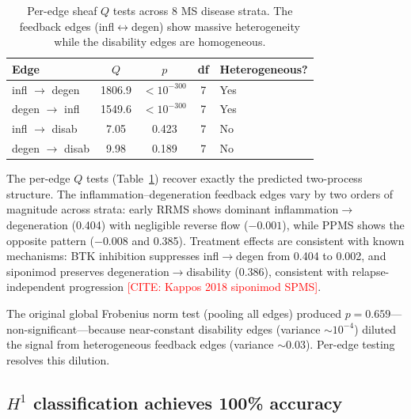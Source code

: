 \documentclass[11pt]{article}
\newcommand{\misscite}[1]{\textcolor{red}{[CITE: #1]}}
\begin{document}
\begin{table}[htbp]
\centering
\caption{Per-edge sheaf $Q$ tests across 8 MS disease strata. The
feedback edges (infl$\leftrightarrow$degen) show massive heterogeneity
while the disability edges are homogeneous.}
\label{tab:p2}
\begin{tabular}{@{}lcccl@{}}
\toprule
Edge & $Q$ & $p$ & df & Heterogeneous? \\
\midrule
infl $\to$ degen & 1806.9 & $< 10^{-300}$ & 7 & Yes \\
degen $\to$ infl & 1549.6 & $< 10^{-300}$ & 7 & Yes \\
infl $\to$ disab & 7.05 & 0.423 & 7 & No \\
degen $\to$ disab & 9.98 & 0.189 & 7 & No \\
\bottomrule
\end{tabular}
\end{table}

The per-edge $Q$ tests (Table~\ref{tab:p2}) recover exactly the
predicted two-process structure. The inflammation--degeneration feedback
edges vary by two orders of magnitude across strata: early RRMS shows
dominant inflammation$\to$degeneration (0.404) with negligible reverse
flow ($-0.001$), while PPMS shows the opposite pattern ($-0.008$ and
0.385). Treatment effects are consistent with known mechanisms: BTK
inhibition suppresses infl$\to$degen from 0.404 to 0.002, and
siponimod preserves degeneration$\to$disability (0.386), consistent
with relapse-independent progression
\misscite{Kappos 2018 siponimod SPMS}.

The original global Frobenius norm test (pooling all edges) produced
$p = 0.659$---non-significant---because near-constant disability edges
(variance $\sim 10^{-4}$) diluted the signal from heterogeneous
feedback edges (variance $\sim 0.03$). Per-edge testing resolves this
dilution.

\subsection{$H^1$ classification achieves 100\% accuracy}
\end{document}
